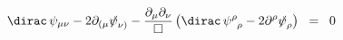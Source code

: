\begin{equation}
\dirac \, \psi_{\mu\nu} - 2 \partial_{( \mu} {{\not}\psi}_{\nu )} -
{\partial_{\mu} \partial_{\nu} \over \square} \left( \dirac \,
\psi^{\rho}_{\;\; \rho} - 2 \partial^{\rho} {{\not}\psi}_{\rho} \right)
\;\; =\;\; 0
\label{eq:3.2}
\end{equation}

